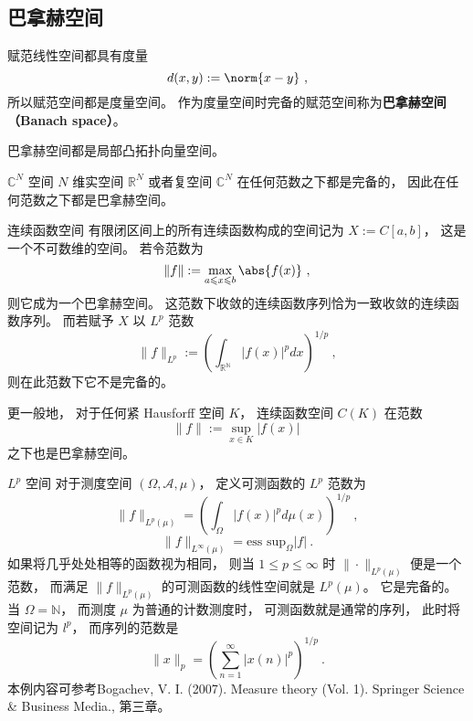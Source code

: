 

\subsection{巴拿赫空间}

赋范线性空间都具有度量
\begin{equation}
d(x,y) := \norm{x-y}~,
\end{equation}
所以赋范空间都是度量空间。 作为度量空间时完备的赋范空间称为\textbf{巴拿赫空间（Banach space）}。

\begin{theorem}{}
巴拿赫空间都是局部凸拓扑向量空间。
\end{theorem}

\begin{example}{$\mathbb C^N$ 空间}
$N$ 维实空间 $\mathbb R^N$ 或者复空间 $\mathbb C^N$ 在任何范数之下都是完备的， 因此在任何范数之下都是巴拿赫空间。
\end{example}

\begin{example}{连续函数空间}
有限闭区间上的所有连续函数构成的空间记为 $X := C[a, b]$， 这是一个不可数维的空间。 若令范数为
$$
\|{f}\|:= \max_{a \leqslant x \leqslant b} \abs{f(x)}~,
$$
则它成为一个巴拿赫空间。 这范数下收敛的连续函数序列恰为一致收敛的连续函数序列。 而若赋予 $X$ 以 $L^p$ 范数
$$
\|f\|_{L^p}:=\left(\int_{\mathbb{R^N}}|f(x)|^pdx\right)^{1/p}~,
$$
则在此范数下它不是完备的。

更一般地， 对于任何紧 Hausforff 空间 $K$， 连续函数空间 $C(K)$ 在范数
$$
\|f\|:=\sup_{x\in K}|f(x)|~
$$
之下也是巴拿赫空间。
\end{example}

\begin{example}{$L^p$ 空间}
对于测度空间 $(\Omega,\mathcal{A},\mu)$， 定义可测函数的 $L^p$ 范数为
$$
\|f\|_{L^p(\mu)}=\left(\int_\Omega |f(x)|^pd\mu(x)\right)^{1/p}~,
$$
$$
\|f\|_{L^\infty(\mu)}=\text{ess sup}_{\Omega}|f|~.
$$
如果将几乎处处相等的函数视为相同， 则当 $1\leq p\leq\infty$ 时 $\|\cdot\|_{L^p(\mu)}$ 便是一个范数， 而满足 $\|f\|_{L^p(\mu)}$ 的可测函数的线性空间就是 $L^p(\mu)$。 它是完备的。 当 $\Omega=\mathbb{N}$， 而测度 $\mu$ 为普通的计数测度时， 可测函数就是通常的序列， 此时将空间记为 $l^p$， 而序列的范数是
$$
\|x\|_p=\left(\sum_{n=1}^\infty|x(n)|^p\right)^{1/p}~.
$$
本例内容可参考Bogachev, V. I. (2007). Measure theory (Vol. 1). Springer Science \& Business Media., 第三章。
\end{example}

